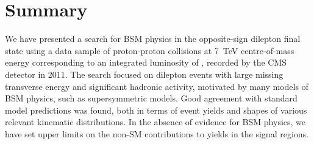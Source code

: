 \section{Summary}
\label{sec:conclusion}

We have presented a search for BSM physics in the opposite-sign dilepton final state using 
a data sample of proton-proton collisions at 7~TeV centre-of-mass energy corresponding to an integrated
luminosity of \lumifinal, recorded by the CMS detector in 2011.
The search focused on dilepton events with large missing transverse energy and significant hadronic activity,
motivated by many models of BSM physics, such as supersymmetric models.
Good agreement with standard model predictions was found, both in terms of event yields and shapes of 
various relevant kinematic distributions. In the absence of evidence for BSM physics, 
we have set upper limits on the non-SM contributions to yields in the signal regions. 
